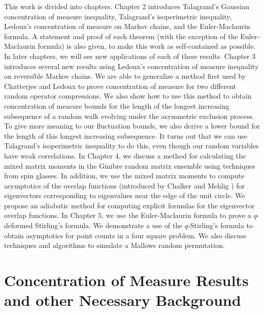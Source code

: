 \documentclass[12pt]{report}
\theoremstyle{definition}
\begin{document}
This work is divided into chapters.  Chapter 2 introduces Talagrand's Gaussian concentration of measure inequality, Talagrand's isoperimetric inequality, Ledoux's concentration of measure on Markov chains, and the Euler-Maclaurin formula.  A statement and proof of each theorem (with the exception of the Euler-Maclaurin formula) is also given, to make this work as self-contained as possible.  In later chapters, we will see new applications of each of these results.  Chapter 3 introduces several new results using Ledoux's concentration of measure inequality on reversible Markov chains.  We are able to generalize a method first used by Chatterjee and Ledoux \cite{ChatLed} to prove concentration of measure for two different random operator compressions.  We also show how to use this method to obtain concentration of measure bounds for the length of the longest increasing subsequence of a random walk evolving under the asymmetric exclusion process.  To give more meaning to our fluctuation bounds, we also derive a lower bound for the length of this longest increasing subsequence.  It turns out that we can use Talagrand's isoperimetric inequality to do this, even though our random variables have weak correlations.  In Chapter 4, we discuss a method for calculating the mixed matrix moments in the Ginibre random matrix ensemble using techniques from spin glasses.  In addition, we use the mixed matrix moments to compute asymptotics of the overlap functions (introduced by Chalker and Mehlig \cite{CM}) for eigenvectors corresponding to eigenvalues near the edge of the unit circle. We propose an adiabatic method for computing explicit formulas for the eigenvector overlap functions.   In Chapter 5, we use the Euler-Maclaurin formula to prove a $q$-deformed Stirling's formula.  We demonstrate a use of the $q$-Stirling's formula to obtain asymptotics for point counts in a four square problem.  We also discuss techniques and algorithms to simulate a Mallows random permutation.  

\chapter{Concentration of Measure Results and other Necessary Background}
\end{document}
